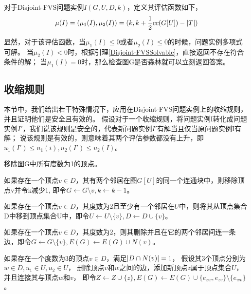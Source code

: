 \begin{definition}
对于Disjoint-FVS问题实例$I(G, U, D, k)$，定义其评估函数如下，
\[\mu(I) = (\mu_1(I), \mu_2(I)) = (k, k + \frac{1}{2}cc(G[U]) - \left\vert T \right\vert)\]
\end{definition}

显然，对于该评估函数，当$\mu_1(I) \le  0$或者$\mu_2(I) \le 0$的时候，问题实例多项式可解。
当$\mu_2(I) < 0$时，根据引理\ref{Disjoint-FVSSolvable}，直接返回不存在符合条件的解；
当$\mu_1(I) = 0$时，那么检查图G是否森林就可以立刻返回答案。

\subsection{收缩规则}
本节中，我们给出若干特殊情况下，应用在Disjoint-FVS问题实例上的收缩规则，并且证明他们是安全且有效的。
假设对于一个收缩规则，将问题实例I转化成问题实例$I'$，我们说该规则是安全的，代表新问题实例$I'$有解当且仅当原问题实例I有解；
说该规则是有效的，则意味着其两个评估参数都没有上升，即$u_1(I') \le u_1(i), u_2(I') \le u_2(I)$。 \\

\begin{reducerule}
移除图G中所有度数为1的顶点。
\end{reducerule}

\begin{reducerule}
如果存在一个顶点$v \in D$，其有两个邻居在图$G[U]$的同一个连通块中，则移除顶点v并令k减少1, 即令$G \leftarrow G \setminus v, k \leftarrow k - 1$。
\end{reducerule}

\begin{reducerule}
如果存在一个顶点$v \in D$，其度数为2且至少有一个邻居在$U$中，则将其从顶点集合D中移到顶点集合U中，即令$U \leftarrow U \setminus \{v\}, D \leftarrow D \cup \{v\}$。
\end{reducerule}

\begin{reducerule}
如果存在一个顶点$v \in D$，其度数为2，则其删除并且在它的两个邻居间连一条边，即令$G \leftarrow G \setminus \{v\}, E(G) \leftarrow E(G) \cup N(v)$。
\end{reducerule}


\begin{reducerule}
如果存在一个度数为3的顶点$v \in D$，满足$\left\vert D \cap N(v) \right\vert = 1$，
假设其3个顶点分别为$w \in D, u_1 \in U, u_2 \in U$，
删除顶点$v$和$w$之间的边，添加新顶点$z$属于顶点集合$U$，并且连接其与顶点$w$和$v$，
即令$Z \leftarrow Z \cup \{z\}, E(G) \leftarrow E(G) \cup \{e_{zw}, e_{zv}\} \setminus \{e_{wv}\}$。
\end{reducerule}


